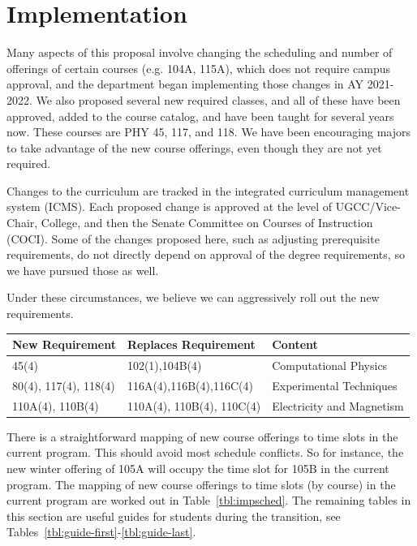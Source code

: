 \documentclass[12pt]{article}
\begin{document}
\newpage
\section{Implementation}
\label{sec:implementation}

Many aspects of this proposal involve changing the scheduling and
number of offerings of certain courses (e.g. 104A, 115A), which does
not require campus approval, and the department began implementing
those changes in AY 2021-2022.  We also proposed several new required
classes, and all of these have been approved, added to the course
catalog, and have been taught for several years now.  These courses
are PHY 45, 117, and 118.  We have been encouraging
majors to take advantage of the new course offerings, even though they
are not yet required.

Changes to the curriculum are tracked in the integrated curriculum
management system (ICMS).  Each proposed change is approved at the
level of UGCC/Vice-Chair, College, and then the Senate Committee on
Courses of Instruction (COCI).  Some of the changes proposed here,
such as adjusting prerequisite requirements, do not directly depend on
approval of the degree requirements, so we have pursued those as well.

Under these circumstances, we believe we can aggressively roll out the
new requirements.  

\noindent
\vskip 0.25cm
\begin{center}
\begin{tabular}{|lll|}
\hline
New Requirement  & Replaces Requirement& Content \\
\hline
45(4)   & 102(1),104B(4) & Computational Physics \\
80(4), 117(4), 118(4) & 116A(4),116B(4),116C(4) & Experimental Techniques\\
110A(4), 110B(4) & 110A(4), 110B(4), 110C(4) & Electricity and Magnetism \\ 
\hline
\end{tabular}
\end{center}

There is a straightforward mapping of new course offerings to time
slots in the current program.  This should avoid most schedule
conflicts.  So for instance, the new winter offering of 105A will
occupy the time slot for 105B in the current program.  The mapping of
new course offerings to time slots (by course) in the current program
are worked out in Table~\ref{tbl:impsched}.  The remaining tables in
this section are useful guides for students during the transition, see
Tables~\ref{tbl:guide-first}-\ref{tbl:guide-last}.
\end{document}
